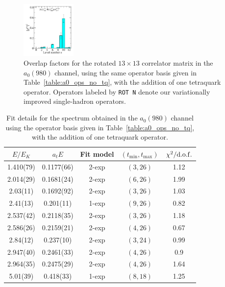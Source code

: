 \begin{figure}
  \includegraphics[width=0.24\textwidth]{figures/spectrum_a1gm/with_tq/zfactors/zfactor_isotriplet_kaon_kbar-A1gm_1-P011-A2-SS_1-P0-1-1-A2-SS_1.pdf}
  \cprotect\caption{Overlap factors for the rotated $13\times 13$ correlator matrix in the $a_0(980)$ channel, using the same operator basis given in Table~\ref{table:a0_ops_no_tq}, with the addition of one tetraquark operator. Operators labeled by \verb+ROT N+ denote our variationally improved single-hadron operators.}
  \label{fig:a0_with_tq_zfactors}
\end{figure}

\begin{table}
  \centering
  \begin{tabular}{c|c|c|c|c}
    $E / E_K$ & $a_t E$ & Fit model & $(t_{\mathrm{min}}, {t_\mathrm{max}})$ & $\chi^2 / \rm{d.o.f.}$\\
    \hline
    1.410(79)&0.1177(66)&2{-}exp&$(3, 26)$&1.12\\
    2.014(29)&0.1681(24)&2{-}exp&$(6, 26)$&1.99\\
    2.03(11)&0.1692(92)&2{-}exp&$(3, 26)$&1.03\\
    2.41(13)&0.201(11)&1{-}exp&$(9, 26)$&0.82\\
    2.537(42)&0.2118(35)&2{-}exp&$(3, 26)$&1.18\\
    2.586(26)&0.2159(21)&2{-}exp&$(4, 26)$&0.67\\
    2.84(12)&0.237(10)&2{-}exp&$(3, 24)$&0.99\\
    2.947(40)&0.2461(33)&2{-}exp&$(4, 26)$&0.9\\
    2.964(35)&0.2475(29)&2{-}exp&$(4, 26)$&1.64\\
    5.01(39)&0.418(33)&1{-}exp&$(8, 18)$&1.25
  \end{tabular}
  \caption{Fit details for the spectrum obtained in the $a_0(980)$ channel using the operator basis given in Table~\ref{table:a0_ops_no_tq}, with the addition of one tetraquark operator.}
  \label{table:a0_with_tq_spectrum}
\end{table}